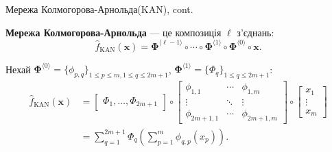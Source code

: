 \documentclass{zkdl-presentation-template}
\begin{document}
    \begin{frame}{Мережа Колмогорова-Арнольда(KAN), cont.}
        \begin{definition}
            \textbf{Мережа Колмогорова-Арнольда} --- це композиція $\ell$ з'єднань:
            \begin{equation*}
                \hat{f}_{\text{KAN}}(\boldsymbol{x}) = \boldsymbol{\Phi}^{\langle \ell-1 \rangle} \circ \cdots \circ \boldsymbol{\Phi}^{\langle 1 \rangle} \circ \boldsymbol{\Phi}^{\langle 0 \rangle} \circ \boldsymbol{x}.
            \end{equation*}
        \end{definition}

        \begin{example}
            Нехай $\boldsymbol{\Phi}^{\langle 0 \rangle} = \{\phi_{p,q}\}_{1 \leq p \leq m, 1 \leq q \leq 2m+1}$, $\boldsymbol{\Phi}^{\langle 1 \rangle} = \{\Phi_q\}_{1 \leq q \leq 2m+1}$:
            \begin{align*}
                \hat{f}_{\text{KAN}}(\boldsymbol{x}) &= \begin{bmatrix}
                    \Phi_1, \dots, \Phi_{2m+1}
                \end{bmatrix} \circ \begin{bmatrix}
                    \phi_{1,1} & \cdots & \phi_{1,m} \\
                    \vdots & \ddots & \vdots \\
                    \phi_{2m+1,1} & \cdots & \phi_{2m+1,m}
                \end{bmatrix} \circ \begin{bmatrix}
                    x_1 \\
                    \vdots \\
                    x_m
                \end{bmatrix} \\
                &= \sum_{q=1}^{2m+1}\Phi_q\left(\sum_{p=1}^m \phi_{q,p}(x_p)\right).
            \end{align*}
        \end{example}
    \end{frame}
\end{document}
